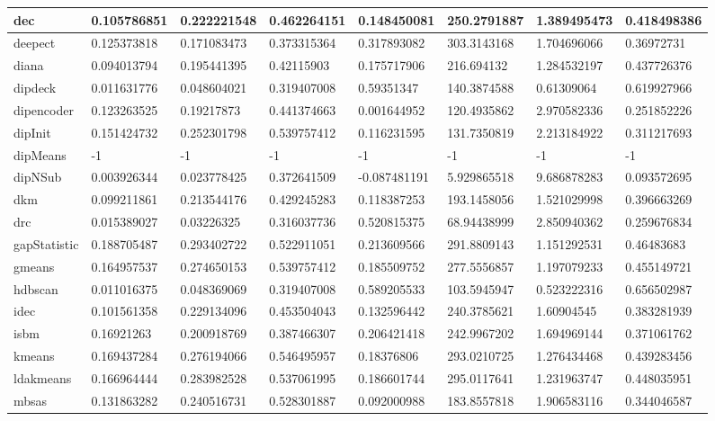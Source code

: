 \begin{table}[H]
\begin{tabular}{|l|l|l|l|l|l|l|l|}
dec & 0.105786851 & 0.222221548 & 0.462264151 & 0.148450081 & 250.2791887 & 1.389495473 & 0.418498386 \\
\hline
deepect & 0.125373818 & 0.171083473 & 0.373315364 & 0.317893082 & 303.3143168 & 1.704696066 & 0.36972731 \\
\hline
diana & 0.094013794 & 0.195441395 & 0.42115903 & 0.175717906 & 216.694132 & 1.284532197 & 0.437726376 \\
\hline
dipdeck & 0.011631776 & 0.048604021 & 0.319407008 & 0.59351347 & 140.3874588 & 0.61309064 & 0.619927966 \\
\hline
dipencoder & 0.123263525 & 0.19217873 & 0.441374663 & 0.001644952 & 120.4935862 & 2.970582336 & 0.251852226 \\
\hline
dipInit & 0.151424732 & 0.252301798 & 0.539757412 & 0.116231595 & 131.7350819 & 2.213184922 & 0.311217693 \\
\hline
dipMeans & -1 & -1 & -1 & -1 & -1 & -1 & -1 \\
\hline
dipNSub & 0.003926344 & 0.023778425 & 0.372641509 & -0.087481191 & 5.929865518 & 9.686878283 & 0.093572695 \\
\hline
dkm & 0.099211861 & 0.213544176 & 0.429245283 & 0.118387253 & 193.1458056 & 1.521029998 & 0.396663269 \\
\hline
drc & 0.015389027 & 0.03226325 & 0.316037736 & 0.520815375 & 68.94438999 & 2.850940362 & 0.259676834 \\
\hline
gapStatistic & 0.188705487 & 0.293402722 & 0.522911051 & 0.213609566 & 291.8809143 & 1.151292531 & 0.46483683 \\
\hline
gmeans & 0.164957537 & 0.274650153 & 0.539757412 & 0.185509752 & 277.5556857 & 1.197079233 & 0.455149721 \\
\hline
hdbscan & 0.011016375 & 0.048369069 & 0.319407008 & 0.589205533 & 103.5945947 & 0.523222316 & 0.656502987 \\
\hline
idec & 0.101561358 & 0.229134096 & 0.453504043 & 0.132596442 & 240.3785621 & 1.60904545 & 0.383281939 \\
\hline
isbm & 0.16921263 & 0.200918769 & 0.387466307 & 0.206421418 & 242.9967202 & 1.694969144 & 0.371061762 \\
\hline
kmeans & 0.169437284 & 0.276194066 & 0.546495957 & 0.18376806 & 293.0210725 & 1.276434468 & 0.439283456 \\
\hline
ldakmeans & 0.166964444 & 0.283982528 & 0.537061995 & 0.186601744 & 295.0117641 & 1.231963747 & 0.448035951 \\
\hline
mbsas & 0.131863282 & 0.240516731 & 0.528301887 & 0.092000988 & 183.8557818 & 1.906583116 & 0.344046587 \\

\end{tabular}
\end{table}
